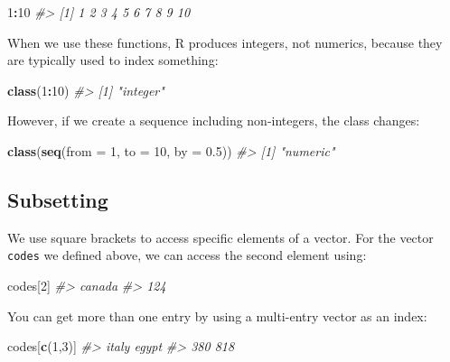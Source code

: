 \documentclass[
]{krantz}
\newenvironment{Shaded}{\begin{snugshade}}{\end{snugshade}}
\newcommand{\CommentTok}[1]{\textcolor[rgb]{0.37,0.37,0.37}{\textit{#1}}}
\newcommand{\DataTypeTok}[1]{\textcolor[rgb]{0.27,0.27,0.27}{#1}}
\newcommand{\DecValTok}[1]{\textcolor[rgb]{0.06,0.06,0.06}{#1}}
\newcommand{\FloatTok}[1]{\textcolor[rgb]{0.06,0.06,0.06}{#1}}
\newcommand{\KeywordTok}[1]{\textcolor[rgb]{0.27,0.27,0.27}{\textbf{#1}}}
\newcommand{\NormalTok}[1]{#1}
\newcommand{\OperatorTok}[1]{\textcolor[rgb]{0.43,0.43,0.43}{\textbf{#1}}}
\begin{document}
\begin{Shaded}
\begin{Highlighting}[]
\DecValTok{1}\OperatorTok{:}\DecValTok{10}
\CommentTok{#>  [1]  1  2  3  4  5  6  7  8  9 10}
\end{Highlighting}
\end{Shaded}

When we use these functions, R produces integers, not numerics, because they are typically used to index something:

\begin{Shaded}
\begin{Highlighting}[]
\KeywordTok{class}\NormalTok{(}\DecValTok{1}\OperatorTok{:}\DecValTok{10}\NormalTok{)}
\CommentTok{#> [1] "integer"}
\end{Highlighting}
\end{Shaded}

However, if we create a sequence including non-integers, the class changes:

\begin{Shaded}
\begin{Highlighting}[]
\KeywordTok{class}\NormalTok{(}\KeywordTok{seq}\NormalTok{(}\DataTypeTok{from =} \DecValTok{1}\NormalTok{, }\DataTypeTok{to =} \DecValTok{10}\NormalTok{, }\DataTypeTok{by =} \FloatTok{0.5}\NormalTok{))}
\CommentTok{#> [1] "numeric"}
\end{Highlighting}
\end{Shaded}

\hypertarget{subsetting}{%
\subsection{Subsetting}\label{subsetting}}

We use square brackets to access specific elements of a vector. For the vector \texttt{codes} we defined above, we can access the second element using:

\begin{Shaded}
\begin{Highlighting}[]
\NormalTok{codes[}\DecValTok{2}\NormalTok{]}
\CommentTok{#> canada }
\CommentTok{#>    124}
\end{Highlighting}
\end{Shaded}

You can get more than one entry by using a multi-entry vector as an index:

\begin{Shaded}
\begin{Highlighting}[]
\NormalTok{codes[}\KeywordTok{c}\NormalTok{(}\DecValTok{1}\NormalTok{,}\DecValTok{3}\NormalTok{)]}
\CommentTok{#> italy egypt }
\CommentTok{#>   380   818}
\end{Highlighting}
\end{Shaded}
\end{document}
